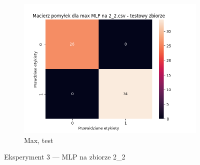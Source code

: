 \documentclass[12pt]{article}
\newcommand*{\subfigwidth}{0.24\textwidth}
\begin{document}
\begin{figure}[H]
\begin{subfigure}[t]{\subfigwidth}
        \includegraphics[width=\linewidth]{img/exp_3/mlp/2_2/max/test_matrix.png}
        \caption{Max, test}
    \end{subfigure}

    \caption{Eksperyment 3 --- MLP na zbiorze 2\_2}\label{fig:figure6}
\end{figure}
\end{document}
